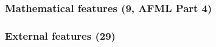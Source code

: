 \documentclass[12pt,a4paper,oneside]{article}
\begin{document}
%
%


\subsubsection{Mathematical features (9, AFML Part 4)}\label{subsubsec:math}

%


\subsubsection{External features (29)}\label{subsubsec:external}
\end{document}
